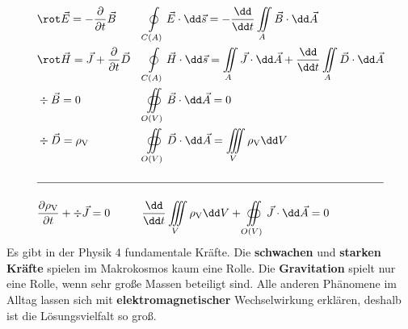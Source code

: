 	  \begin{align}
		   & \rot \vec{E}= -\dfrac{\partial}{\partial t}\vec{B}          &  & \oint\limits_{C(A)}\vec{E}\cdot \dd\vec{s}= -\dfrac{\dd}{\dd t}\iint\limits_{A}\vec{B}\cdot \dd\vec{A}                                         \\
		   & \rot \vec{H}= \vec{J}+\dfrac{\partial}{\partial t}\vec{D}   &  & \oint\limits_{C(A)}\vec{H}\cdot \dd\vec{s}= \iint\limits_{A}\vec{J}\cdot \dd\vec{A}+ \dfrac{\dd}{\dd t}\iint\limits_{A}\vec{D}\cdot \dd\vec{A} \\
		   & \div \vec{B}= 0                                             &  & \oiint\limits_{O(V)}\vec{B}\cdot \dd\vec{A}= 0                                                                                                 \\
		   & \div \vec{D}= \rho_{\text{V}}                               &  & \oiint\limits_{O(V)}\vec{D}\cdot \dd\vec{A}= \iiint\limits_{V}\rho_{\text{V}}\dd V                                                             \\
		  \nonumber                                                                                                                                                                                         \\
		  \hline
		  \nonumber                                                                                                                                                                                                          \\
		   & \dfrac{\partial \rho_\text{V}}{\partial t}+ \div \vec{J}= 0 &  & \dfrac{\dd}{\dd t}\iiint\limits_{V}\rho_{\text{V}}\dd V + \oiint\limits_{O(V)}\vec{J}\cdot \dd\vec{A}= 0
	  \end{align}
	  Es gibt in der Physik 4 fundamentale Kräfte. Die \textbf{schwachen} und \textbf{starken} \textbf{Kräfte} spielen im Makrokosmos kaum eine Rolle. Die \textbf{Gravitation} spielt nur eine Rolle, wenn sehr große Massen beteiligt sind. Alle anderen Phänomene im Alltag lassen sich mit \textbf{elektromagnetischer} Wechselwirkung erklären, deshalb ist die Lösungsvielfalt so groß.
